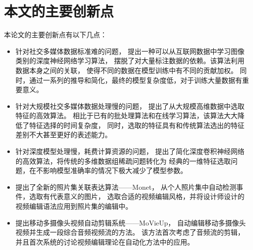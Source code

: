 \section{本文的主要创新点}
本论文的主要创新点有以下几点：
\begin{itemize}
    \item 针对社交多媒体数据标准难的问题，
        提出一种可以从互联网数据中学习图像类别的深度神经网络学习算法，
        摆脱了对大量标注数据的依赖。该算法利用数据本身之间的关联，
        使得不同的数据在模型训练中有不同的贡献加权。
        同时，通过一系列的推导和简化，最终的模型复杂度低，对于训练大量数据有重要意义。

    \item 针对大规模社交多媒体数据处理慢的问题，
        提出了从大规模高维数据中选取特征的高效算法。
        相比于已有的批处理算法和在线学习算法，该算法大大降低了特征选择的时间复杂度，
        同时，选取的特征具有和传统算法选出的特征差别不大甚至更好的表述能力。

    \item 针对深度模型处理慢，耗费计算资源的问题，
        提出了简化深度卷积神经网络的高效算法，将传统的多维数据组稀疏问题转化为
        经典的一维特征选取问题，在不影响模型准确率的情况下极大减少了模型参数。

    \item 提出了全新的照片集关联表达算法——Monet，
        从个人照片集中自动检测事件，选取有代表意义的图片，
        选取合适的视频编辑风格，并将设计师设计的视频编辑语法应用到照片集的编辑中。

    \item 提出移动多摄像头视频自动剪辑系统——MoVieUp，
        自动编辑移动多摄像头视频并生成一段综合音频视频流的方法。
        该方法首次考虑了音频流的剪辑，
        并且首次系统的讨论视频编辑理论在自动化方法中的应用。
\end{itemize}

